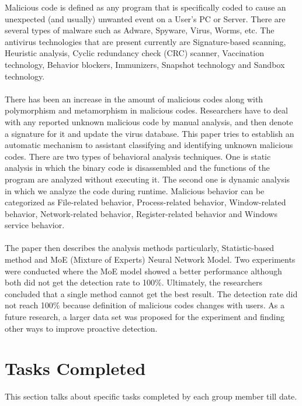 \documentclass[11pt]{article}
\begin{document}
	Malicious code is defined as any program that is specifically coded to cause an unexpected (and usually) unwanted event on a User’s PC or Server. There are several types of malware such as Adware, Spyware, Virus, Worms, etc. The antivirus technologies that are present currently are Signature-based scanning,	Heuristic analysis, Cyclic redundancy check (CRC) scanner, Vaccination technology, Behavior blockers, Immunizers, Snapshot technology and Sandbox technology.\\ \\
	There has been an increase in the amount of malicious codes along with polymorphism and metamorphism in malicious codes. Researchers have to deal with any reported unknown malicious code by manual analysis, and then denote a signature for it and update the virus database. This paper tries to establish an automatic mechanism to assistant classifying and identifying unknown malicious codes. There are two types of behavioral analysis techniques. One is static analysis in which the binary code is disassembled and the functions of the program are analyzed without executing it. The second one is dynamic analysis in which we analyze the code during runtime. Malicious behavior can be categorized as File-related behavior, Process-related behavior, Window-related behavior, Network-related behavior, Register-related behavior and Windows service behavior.\\ \\
	The paper then describes the analysis methods particularly, Statistic-based method and MoE (Mixture of Experts) Neural Network Model. Two experiments were conducted where the MoE model showed a better performance although both did not get the detection rate to 100\%. Ultimately, the researchers concluded that a single method cannot get the best result.  The detection rate did not reach 100\% because definition of malicious codes changes with users. As a future research, a larger data set was proposed for the experiment and finding other ways to improve proactive detection.	
	
	\section{Tasks Completed}
	This section talks about specific tasks completed by each group member till date.
\end{document}
